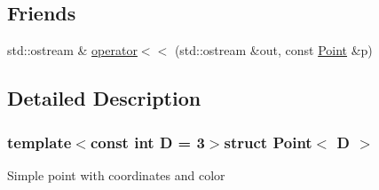 \subsection*{Friends}
\begin{DoxyCompactItemize}
\item 
std\-::ostream \& \hyperlink{structPoint_aa818efa680e0d94ce91173ccb4b7aa08}{operator$<$$<$} (std\-::ostream \&out, const \hyperlink{structPoint}{Point} \&p)
\end{DoxyCompactItemize}


\subsection{Detailed Description}
\subsubsection*{template$<$const int D = 3$>$struct Point$<$ D $>$}

Simple point with coordinates and color 

